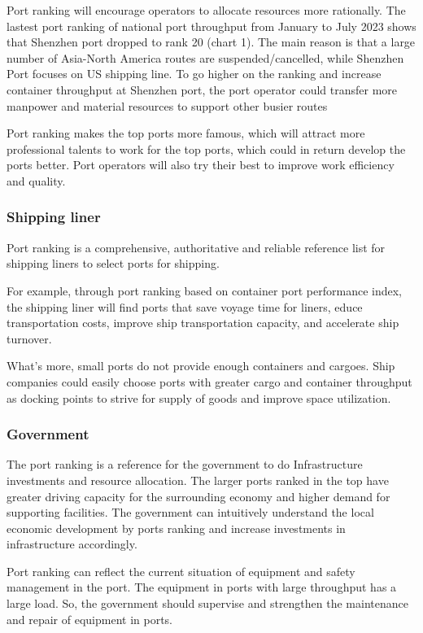 \documentclass[preprint]{elsarticle}
\begin{document}
Port ranking will encourage operators to allocate resources more rationally. The lastest port ranking of national port throughput from January to July 2023 shows that Shenzhen port dropped to rank 20 (chart 1). The main reason is that a large number of Asia-North America routes are suspended/cancelled, while Shenzhen Port focuses on US shipping line. To go higher on the ranking and increase container throughput at Shenzhen port, the port operator could transfer more manpower and material resources to support other busier routes

Port ranking makes the top ports more famous, which will attract more professional talents to work for the top ports, which could in return develop the ports better. Port operators will also try their best to improve work efficiency and quality.
\subsubsection{Shipping liner}
Port ranking is a comprehensive, authoritative and reliable reference list for shipping liners to select ports for shipping.

For example, through port ranking based on container port performance index, the shipping liner will find ports that save voyage time for liners, educe transportation costs, improve ship transportation capacity, and accelerate ship turnover.

What's more, small ports do not provide enough containers and cargoes. Ship companies could easily choose ports with greater cargo and container throughput as docking points to strive for supply of goods and improve space utilization.
\subsubsection{Government}

The port ranking is a reference for the government to do Infrastructure investments and resource allocation. The larger ports ranked in the top have greater driving capacity for the surrounding economy and higher demand for supporting facilities. The government can intuitively understand the local economic development by ports ranking and increase investments in infrastructure accordingly.

Port ranking can reflect the current situation of equipment and safety management in the port. The equipment in ports with large throughput has a large load. So, the government should supervise and strengthen the maintenance and repair of equipment in ports.
\end{document}
